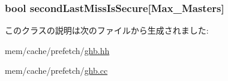 \label{classGHBPrefetcher_ac6c833cc27241202aa468eebe86fe416}
\hypertarget{classGHBPrefetcher_a7fa6cd326e4e080df811a14e8ad1672c}{
\subsubsection[{secondLastMissIsSecure}]{\setlength{\rightskip}{0pt plus 5cm}bool {\bf secondLastMissIsSecure}\mbox{[}{\bf Max\_\-Masters}\mbox{]}}}
\label{classGHBPrefetcher_a7fa6cd326e4e080df811a14e8ad1672c}


このクラスの説明は次のファイルから生成されました:\begin{DoxyCompactItemize}
\item 
mem/cache/prefetch/\hyperlink{ghb_8hh}{ghb.hh}\item 
mem/cache/prefetch/\hyperlink{ghb_8cc}{ghb.cc}\end{DoxyCompactItemize}
